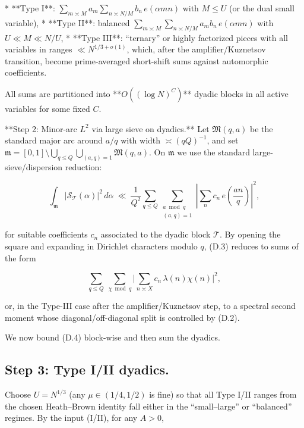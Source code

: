 \documentclass[11pt]{article}
\theoremstyle{definition}
\theoremstyle{remark}
\begin{document}
* **Type I**: $\displaystyle \sum_{m\asymp M} a_m \sum_{n\asymp N/M} b_n\,e(\alpha mn)$ with $M\le U$ (or the dual small variable),
* **Type II**: balanced $\displaystyle \sum_{m\asymp M}\sum_{n\asymp N/M} a_m b_n\,e(\alpha mn)$ with $U\ll M\ll N/U$,
* **Type III**: “ternary” or highly factorized pieces with all variables in ranges $ \ll N^{1/3+o(1)}$, which, after the amplifier/Kuznetsov transition, become prime-averaged short-shift sums against automorphic coefficients.

All sums are partitioned into **$O((\log N)^C)$** dyadic blocks in all active variables for some fixed $C$.

**Step 2: Minor-arc $L^2$ via large sieve on dyadics.**
Let $\mathfrak M(q,a)$ be the standard major arc around $a/q$ with width $\asymp (qQ)^{-1}$, and set $\mathfrak m=[0,1]\setminus \bigcup_{q\le Q}\bigcup_{(a,q)=1}\mathfrak M(q,a)$. On $\mathfrak m$ we use the standard large-sieve/dispersion reduction:

\begin{equation}
\int_{\mathfrak m} \big|\mathcal S_{\mathcal T}(\alpha)\big|^2\,d\alpha
\ \ll\ \frac{1}{Q^2}\sum_{q\le Q}\sum_{\substack{a\bmod q\\(a,q)=1}}
\left|\sum_{n} c_n\,e\!\left(\frac{an}{q}\right)\right|^2,
\tag{D.3}
\end{equation}

for suitable coefficients $c_n$ associated to the dyadic block $\mathcal T$. By opening the square and expanding in Dirichlet characters modulo $q$, (D.3) reduces to sums of the form

\begin{equation}
\sum_{q\le Q}\ \sum_{\chi\bmod q}
\Big|\sum_{n\asymp X} c_n\,\lambda(n)\chi(n)\Big|^2,
\tag{D.4}
\end{equation}

or, in the Type-III case after the amplifier/Kuznetsov step, to a spectral second moment whose diagonal/off-diagonal split is controlled by (D.2).

We now bound (D.4) block-wise and then sum the dyadics.


\subsection*{Step 3: Type I/II dyadics.}
Choose $U=N^{1/3}$ (any $\mu\in(1/4,1/2)$ is fine) so that all Type I/II ranges from the chosen Heath–Brown identity fall either in the “small–large” or “balanced” regimes. By the input (I/II), for any $A>0$,
\end{document}
